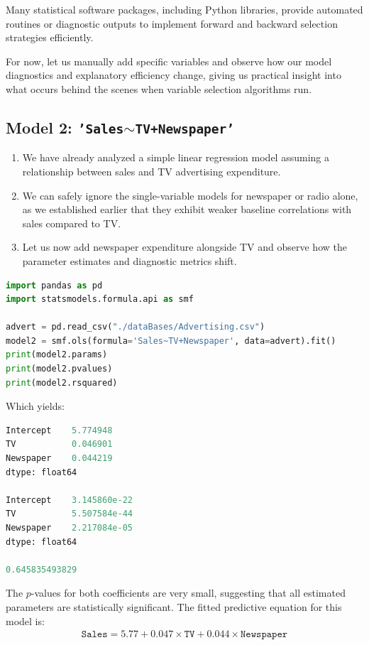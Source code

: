 Many statistical software packages, including Python libraries, provide automated routines or diagnostic outputs to implement forward and backward selection strategies efficiently.

For now, let us manually add specific variables and observe how our model diagnostics and explanatory efficiency change, giving us practical insight into what occurs behind the scenes when variable selection algorithms run.

\subsection{Model 2: \texttt{'Sales$\sim$TV+Newspaper'}}

\begin{enumerate}
	\item We have already analyzed a simple linear regression model assuming a relationship between sales and TV advertising expenditure.
	\item We can safely ignore the single-variable models for newspaper or radio alone, as we established earlier that they exhibit weaker baseline correlations with sales compared to TV.
	\item Let us now add newspaper expenditure alongside TV and observe how the parameter estimates and diagnostic metrics shift.
\end{enumerate}

\begin{lstlisting}[language=Python]
import pandas as pd
import statsmodels.formula.api as smf

advert = pd.read_csv("./dataBases/Advertising.csv")
model2 = smf.ols(formula='Sales~TV+Newspaper', data=advert).fit()
print(model2.params)
print(model2.pvalues)
print(model2.rsquared)
\end{lstlisting}

Which yields:
\begin{lstlisting}[language=Python]
Intercept    5.774948
TV           0.046901
Newspaper    0.044219
dtype: float64

Intercept    3.145860e-22
TV           5.507584e-44
Newspaper    2.217084e-05
dtype: float64

0.645835493829
\end{lstlisting}

The $p$-values for both coefficients are very small, suggesting that all estimated parameters are statistically significant. The fitted predictive equation for this model is:
\begin{align}
	\texttt{Sales} = 5.77 + 0.047 \times \texttt{TV} + 0.044 \times \texttt{Newspaper}
\end{align}

